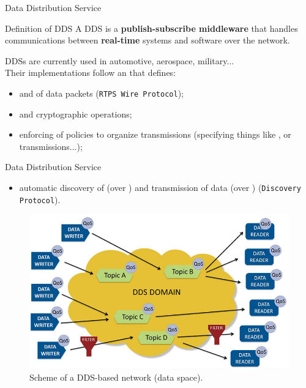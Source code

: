 \begin{frame}{Data Distribution Service}
	\begin{block}{Definition of DDS}
		A DDS is a \textbf{publish-subscribe middleware} that handles communications between \textbf{real-time} systems and software over the network.
	\end{block}
  DDSs are currently used in automotive, aerospace, military...\\
	Their implementations follow an  that defines:
	\begin{itemize}
		\item {} and  of data packets (\texttt{RTPS Wire Protocol});
		\item {} and cryptographic operations;
		\item enforcing of  policies to organize transmissions (specifying things like ,  or  transmissions...);
	\end{itemize}
\end{frame}
\begin{frame}{Data Distribution Service}
  \begin{itemize}
		\item automatic discovery of  (over ) and transmission of data (over ) (\texttt{Discovery Protocol}).
  \end{itemize}
	\begin{figure}
		\centering
		\includegraphics[scale=.32]{ddsDomain.jpg}
		\caption{Scheme of a DDS-based network (data space).}
		\label{fig:ddsdomain}
	\end{figure}
\end{frame}
